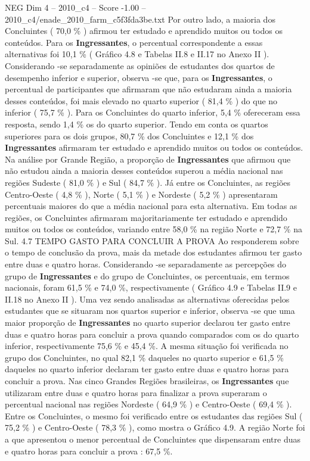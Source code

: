 \begin{textsample}{NEG Dim 4 – 2010\_c4 – Score -1.00 – 2010\_c4/enade\_2010\_farm\_c5f3fda3be.txt}
Por outro lado, a maioria dos Concluintes ( 70,0 \% ) afirmou ter estudado e aprendido muitos ou todos os conteúdos.
Para os \textbf{Ingressantes}, o percentual correspondente a essas alternativas foi 10,1 \% ( Gráfico 4.8 e Tabelas II.8 e II.17 no Anexo II ).
Considerando -se separadamente as opiniões de estudantes dos quartos de desempenho inferior e superior, observa -se que, para os \textbf{Ingressantes}, o percentual de participantes que afirmaram que não estudaram ainda a maioria desses conteúdos, foi mais elevado no quarto superior ( 81,4 \% ) do que no inferior ( 75,7 \% ).
Para os Concluintes do quarto inferior, 5,4 \% ofereceram essa resposta, sendo 1,4 \% os do quarto superior.
Tendo em conta os quartos superiores para os dois grupos, 80,7 \% dos Concluintes e 12,1 \% dos \textbf{Ingressantes} afirmaram ter estudado e aprendido muitos ou todos os conteúdos.
Na análise por Grande Região, a proporção de \textbf{Ingressantes} que afirmou que não estudou ainda a maioria desses conteúdos superou a média nacional nas regiões Sudeste ( 81,0 \% ) e Sul ( 84,7 \% ).
Já entre os Concluintes, as regiões Centro-Oeste ( 4,8 \% ), Norte ( 5,1 \% ) e Nordeste ( 5,2 \% ) apresentaram percentuais maiores do que a média nacional para esta alternativa.
Em todas as regiões, os Concluintes afirmaram majoritariamente ter estudado e aprendido muitos ou todos os conteúdos, variando entre 58,0 \% na região Norte e 72,7 \% na Sul. 4.7 TEMPO GASTO PARA CONCLUIR A PROVA Ao responderem sobre o tempo de conclusão da prova, mais da metade dos estudantes afirmou ter gasto entre duas e quatro horas.
Considerando -se separadamente as percepções do grupo de \textbf{Ingressantes} e do grupo de Concluintes, os percentuais, em termos nacionais, foram 61,5 \% e 74,0 \%, respectivamente ( Gráfico 4.9 e Tabelas II.9 e II.18 no Anexo II ).
Uma vez sendo analisadas as alternativas oferecidas pelos estudantes que se situaram nos quartos superior e inferior, observa -se que uma maior proporção de \textbf{Ingressantes} no quarto superior declarou ter gasto entre duas e quatro horas para concluir a prova quando comparados com os do quarto inferior, respectivamente 75,6 \% e 45,4 \%.
A mesma situação foi verificada no grupo dos Concluintes, no qual 82,1 \% daqueles no quarto superior e 61,5 \% daqueles no quarto inferior declaram ter gasto entre duas e quatro horas para concluir a prova.
Nas cinco Grandes Regiões brasileiras, os \textbf{Ingressantes} que utilizaram entre duas e quatro horas para finalizar a prova superaram o percentual nacional nas regiões Nordeste ( 64,9 \% ) e Centro-Oeste ( 69,4 \% ).
Entre os Concluintes, o mesmo foi verificado entre os estudantes das regiões Sul ( 75,2 \% ) e Centro-Oeste ( 78,3 \% ), como mostra o Gráfico 4.9.
A região Norte foi a que apresentou o menor percentual de Concluintes que dispensaram entre duas e quatro horas para concluir a prova : 67,5 \%.

\end{textsample}
